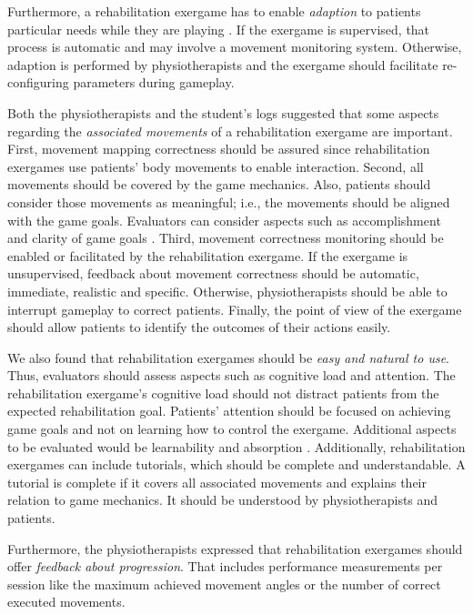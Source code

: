 Furthermore, a rehabilitation exergame has to enable \textit{adaption} to patients particular needs while they are playing \autocite{Cameirao2010,Ni2014,Nijholt2008,Wiemeyer2015}. If the exergame is supervised, that process is automatic and may involve a movement monitoring system. Otherwise, adaption is performed by physiotherapists and the exergame should facilitate re-configuring parameters during gameplay.

Both the physiotherapists and the student's logs suggested that some aspects regarding the \textit{associated movements} of a rehabilitation exergame are important. First, movement mapping correctness should be assured since rehabilitation exergames use patients' body movements to enable interaction. Second, all movements should be covered by the game mechanics. Also, patients should consider those movements as meaningful; i.e., the movements should be aligned with the game goals. Evaluators can consider aspects such as accomplishment \autocite{Cameirao2010,Zhao2016} and clarity of game goals \autocite{Desurvire2009,VandenAbeele2016}. Third, movement correctness monitoring should be enabled or facilitated by the rehabilitation exergame. If the exergame is unsupervised, feedback about movement correctness should be automatic, immediate, realistic and specific. Otherwise, physiotherapists should be able to interrupt gameplay to correct patients. Finally, the point of view of the exergame should allow patients to identify the outcomes of their actions easily.

We also found that rehabilitation exergames should be \textit{easy and natural to use}. Thus, evaluators should assess aspects such as cognitive load and attention. The rehabilitation exergame’s cognitive load should not distract patients from the expected rehabilitation goal. Patients’ attention should be focused on achieving game goals and not on learning how to control the exergame. Additional aspects to be evaluated would be learnability \autocite{Desurvire2009,GonzalezSanchez2009} and absorption \autocite{Lapas2015}. Additionally, rehabilitation exergames can include tutorials, which should be complete and understandable. A tutorial is complete if it covers all associated movements and explains their relation to game mechanics. It should be understood by physiotherapists and patients.

Furthermore, the physiotherapists expressed that rehabilitation exergames should offer \textit{feedback about progression}. That includes performance measurements per session like the maximum achieved movement angles or the number of correct executed movements.

